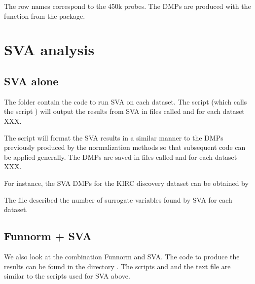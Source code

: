 \documentclass[12pt]{article}
\begin{document}
The row names correspond to the 450k probes. The DMPs are produced with the function  from the  package. 

\section{SVA analysis}

\subsection{SVA alone}

The folder  contain the code to run SVA  on each dataset. The script  (which calls the script ) will output the results from SVA in files called  and  for each dataset XXX. 

The script  will format the SVA results in a similar manner to the DMPs previously produced by the normalization methods so that subsequent code can be applied generally. The DMPs are saved in files called  and  for each dataset XXX. 

For instance, the SVA DMPs for the KIRC discovery dataset can be obtained by

\begin{knitrout}
\color{fgcolor}\begin{kframe}
\begin{alltt}
\hlstd{(}\hlstd{))}
\hlstd{(}\hlstd{)}
\end{alltt}
\end{kframe}
\end{knitrout}

The file  described the number of surrogate variables found by SVA for each dataset. 
\subsection{Funnorm + SVA}

We also look at the combination Funnorm  and SVA. The code to produce the results can be found in the directory . The scripts and  and the text file  are similar to the scripts used for SVA above. 
\end{document}

